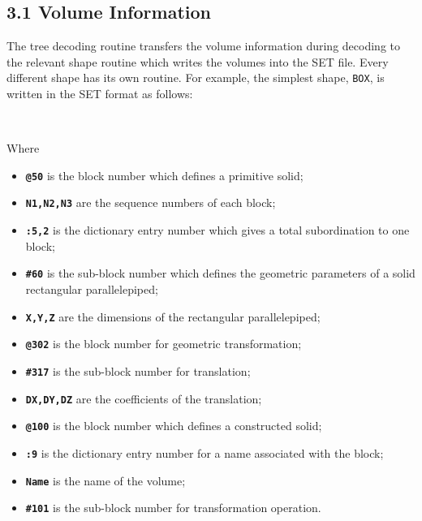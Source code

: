  
\subsection*{3.1 Volume Information}
 
 
The tree decoding routine transfers the volume information
during decoding to the relevant
shape routine which writes the volumes into the SET file.
Every different shape has its own routine.
For example, the simplest shape, {\tt BOX}, is written
in the  SET format as follows:
 
\\
 
\newpage
 
\noindent Where\\[-0.7cm]
\begin{itemize}
\item {\bf{\tt @50}} is the block number which defines a primitive
 solid;\\[-0.7cm]
\item {\bf{\tt N1,N2,N3}} are the sequence numbers of each block;\\[-0.7cm]
\item {\bf{\tt :5,2}}  is the dictionary entry number which gives a total
subordination to one block;\\[-0.7cm]
\item {\bf{\tt \#60}} is the sub-block number which defines the geometric
parameters of a solid rectangular parallelepiped;\\[-0.7cm]
\item {\bf{\tt X,Y,Z}} are the dimensions of the rectangular
 parallelepiped;\\[-0.7cm]
\item {\bf{\tt @302}} is the block number for geometric
 transformation;\\[-0.7cm]
\item {\bf{\tt \#317}} is the sub-block number for translation;\\[-0.7cm]
\item {\bf{\tt DX,DY,DZ}} are the coefficients of the translation;\\[-0.7cm]
\item {\bf{\tt @100}} is the block number which defines a constructed
 solid;\\[-0.7cm]
\item {\bf{\tt :9}}  is the dictionary entry number for a name associated
with the block;\\[-0.7cm]
\item {\bf \tt Name} is the name of the volume;\\[-0.7cm]
\item {\bf{\tt \#101}} is the sub-block number for transformation
 operation.\\[-0.5cm]
\end{itemize}
 

